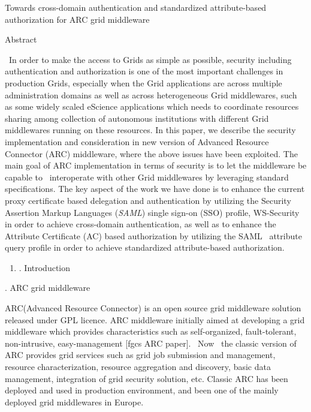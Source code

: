 \documentclass{article}
\title{}
\newcommand\liststyleLi{%
\renewcommand\theenumi{\arabic{enumi}}
\renewcommand\theenumii{\arabic{enumii}}
\renewcommand\theenumiii{\arabic{enumiii}}
\renewcommand\theenumiv{\arabic{enumiv}}
\renewcommand\labelenumi{\theenumi.}
\renewcommand\labelenumii{\theenumii.}
\renewcommand\labelenumiii{\theenumiii.}
\renewcommand\labelenumiv{\theenumiv.}
}
\begin{document}
{\centering
Towards cross-domain authentication and standardized attribute-based
authorization for ARC grid middleware
\par}


\bigskip

{\centering
Abstract
\par}

\ In order to make the access to Grids as simple as possible, security
including authentication and authorization is one of the most important
challenges in production Grids, especially when the Grid applications
are across multiple administration domains as well as across
heterogeneous Grid middlewares, such as some widely scaled eScience
applications which needs to coordinate resources sharing among
collection of autonomous institutions with different Grid middlewares
running on these resources. In this paper, we describe the security
implementation and consideration in new version of Advanced Resource
Connector (ARC) middleware, where the above issues have been exploited.
The main goal of ARC implementation in terms of security is to let the
middleware be capable to \ interoperate with other Grid middlewares by
leveraging standard specifications. The key aspect of the work we have
done is to enhance the current proxy certificate based delegation and
authentication by utilizing the Security Assertion Markup Languages
(\textit{SAML}) single sign-on (SSO) profile, WS-Security in order to
achieve cross-domain authentication, as well as to enhance the
Attribute Certificate (AC) based authorization by utilizing the SAML
\ attribute query profile in order to achieve standardized
attribute-based authorization. \ 


\bigskip

\liststyleLi
\begin{enumerate}
\item[] {. Introduction
\par}
\end{enumerate}

\bigskip


\bigskip


\bigskip

{. ARC grid middleware 
\par}

ARC(Advanced Resource Connector) is an open source grid middleware
solution released under GPL licence. ARC middleware initially aimed at
developing a grid middleware which provides characteristics such as
self-organized, fault-tolerant, non-intrusive, easy-management [fgcs
ARC paper]. \ Now \ the classic version of ARC provides grid services
such as grid job submission and management, resource characterization,
resource aggregation and discovery, basic data management, integration
of grid security solution, etc. Classic ARC has been deployed and used
in production environment, and been one of the mainly deployed grid
middlewares in Europe.
\end{document}

